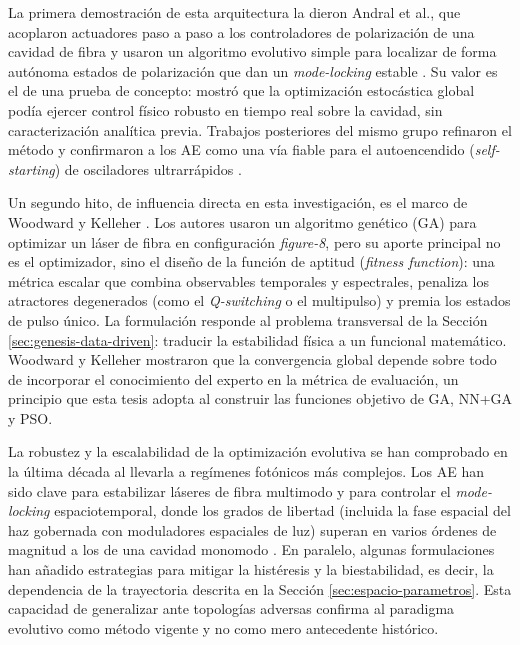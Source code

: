 La primera demostración de esta arquitectura la dieron Andral et al., que acoplaron actuadores paso a paso a los controladores de polarización de una cavidad de fibra y usaron un algoritmo evolutivo simple para localizar de forma autónoma estados de polarización que dan un \emph{mode-locking} estable \cite{Andral2015}. Su valor es el de una prueba de concepto: mostró que la optimización estocástica global podía ejercer control físico robusto en tiempo real sobre la cavidad, sin caracterización analítica previa. Trabajos posteriores del mismo grupo refinaron el método y confirmaron a los AE como una vía fiable para el autoencendido (\emph{self-starting}) de osciladores ultrarrápidos \cite{Andral2016}.

Un segundo hito, de influencia directa en esta investigación, es el marco de Woodward y Kelleher \cite{Woodward2016}. Los autores usaron un algoritmo genético (GA) para optimizar un láser de fibra en configuración \emph{figure-8}, pero su aporte principal no es el optimizador, sino el diseño de la función de aptitud (\emph{fitness function}): una métrica escalar que combina observables temporales y espectrales, penaliza los atractores degenerados (como el \emph{Q-switching} o el multipulso) y premia los estados de pulso único. La formulación responde al problema transversal de la Sección \ref{sec:genesis-data-driven}: traducir la estabilidad física a un funcional matemático. Woodward y Kelleher mostraron que la convergencia global depende sobre todo de incorporar el conocimiento del experto en la métrica de evaluación, un principio que esta tesis adopta al construir las funciones objetivo de GA, NN+GA y PSO.

La robustez y la escalabilidad de la optimización evolutiva se han comprobado en la última década al llevarla a regímenes fotónicos más complejos. Los AE han sido clave para estabilizar láseres de fibra multimodo y para controlar el \emph{mode-locking} espaciotemporal, donde los grados de libertad (incluida la fase espacial del haz gobernada con moduladores espaciales de luz) superan en varios órdenes de magnitud a los de una cavidad monomodo \cite{Wright2017,Wei2020}. En paralelo, algunas formulaciones han añadido estrategias para mitigar la histéresis y la biestabilidad, es decir, la dependencia de la trayectoria descrita en la Sección \ref{sec:espacio-parametros}. Esta capacidad de generalizar ante topologías adversas confirma al paradigma evolutivo como método vigente y no como mero antecedente histórico.

